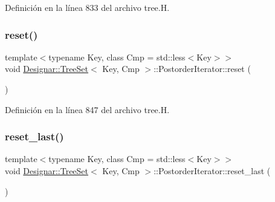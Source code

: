 Definición en la línea 833 del archivo tree.\+H.

\mbox{\label{class_designar_1_1_tree_set_1_1_postorder_iterator_a776630cf833ad659523ef4ca99c06553}} 
\subsubsection{\texorpdfstring{reset()}{reset()}}
{\footnotesize\ttfamily template$<$typename Key, class Cmp = std\+::less$<$\+Key$>$$>$ \\
void \hyperlink{class_designar_1_1_tree_set}{Designar\+::\+Tree\+Set}$<$ Key, Cmp $>$\+::Postorder\+Iterator\+::reset (\begin{DoxyParamCaption}{ }\end{DoxyParamCaption})\hspace{0.3cm}{\ttfamily [inline]}}



Definición en la línea 847 del archivo tree.\+H.

\mbox{\label{class_designar_1_1_tree_set_1_1_postorder_iterator_a857b3dcc1e25a235f72d0208cdd362a4}} 
\subsubsection{\texorpdfstring{reset\+\_\+last()}{reset\_last()}}
{\footnotesize\ttfamily template$<$typename Key, class Cmp = std\+::less$<$\+Key$>$$>$ \\
void \hyperlink{class_designar_1_1_tree_set}{Designar\+::\+Tree\+Set}$<$ Key, Cmp $>$\+::Postorder\+Iterator\+::reset\+\_\+last (\begin{DoxyParamCaption}{ }\end{DoxyParamCaption})\hspace{0.3cm}{\ttfamily [inline]}}



